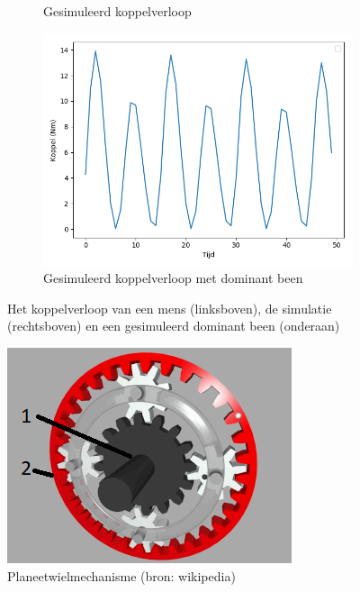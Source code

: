 \begin{figure}[t!]
\begin{subfigure}{.5\textwidth}
  \caption{Gesimuleerd koppelverloop}
  \label{fig:gesimuleerdkoppelverloop}
\end{subfigure}
\begin{subfigure}{.5\textwidth}
  \centering
  \includegraphics[width=\linewidth]{images/gesimuleerdekoppeldominantbeen.png}
  \caption{Gesimuleerd koppelverloop met dominant been}
  \label{fig:gesimuleerde koppel dominant been}
\end{subfigure}
\caption{Het koppelverloop van een mens (linksboven), de simulatie (rechtsboven) en een gesimuleerd dominant been (onderaan)}
\label{fig:test}
\end{figure}
\newpage
\begin{figure}
  \centering
  \includegraphics[width=\linewidth]{images/planeetwielmechanisme.png}
  \caption{Planeetwielmechanisme (bron: wikipedia)}
  \label{fig:planeetwielmechanisme}
\end{figure}

